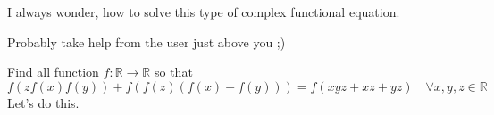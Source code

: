 \begin{solution}
	I always wonder, how to solve this type of complex functional equation.
\end{solution}



\begin{solution}
	Probably take help from the user just above you ;) 
\end{solution}



\begin{solution}
	Find all function $f : \mathbb{R} \to \mathbb{R}$ so that
$$f(z f(x) f(y)) + f( f(z) (f(x) + f(y) ) ) = f(xyz + xz + yz) \quad \forall x,y,z \in \mathbb{R}$$
 Let's do this.



\end{solution}



